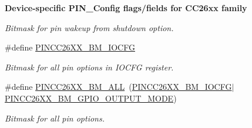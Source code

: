\begin{Indent}{\bf Device-\/specific P\+I\+N\+\_\+\+Config flags/fields for C\+C26xx family}
\begin{DoxyCompactItemize}
\begin{DoxyCompactList}\small\item\em Bitmask for pin wakeup from shutdown option. \end{DoxyCompactList}\item 
\#define \hyperlink{_p_i_n_c_c26_x_x_8h_aa0f69a925a6849e92f2b52506dce84fe}{P\+I\+N\+C\+C26\+X\+X\+\_\+\+B\+M\+\_\+\+I\+O\+C\+F\+G}
\begin{DoxyCompactList}\small\item\em Bitmask for all pin options in I\+O\+C\+F\+G register. \end{DoxyCompactList}\item 
\#define \hyperlink{_p_i_n_c_c26_x_x_8h_ad738c6c4e365f3a63d4a5620ecfa9766}{P\+I\+N\+C\+C26\+X\+X\+\_\+\+B\+M\+\_\+\+A\+L\+L}~(\hyperlink{_p_i_n_c_c26_x_x_8h_aa0f69a925a6849e92f2b52506dce84fe}{P\+I\+N\+C\+C26\+X\+X\+\_\+\+B\+M\+\_\+\+I\+O\+C\+F\+G}$\vert$\hyperlink{_p_i_n_c_c26_x_x_8h_a66fd916ff55cf49609303cec1c82f2bc}{P\+I\+N\+C\+C26\+X\+X\+\_\+\+B\+M\+\_\+\+G\+P\+I\+O\+\_\+\+O\+U\+T\+P\+U\+T\+\_\+\+M\+O\+D\+E})
\begin{DoxyCompactList}\small\item\em Bitmask for all pin options. \end{DoxyCompactList}\end{DoxyCompactItemize}
\end{Indent}
